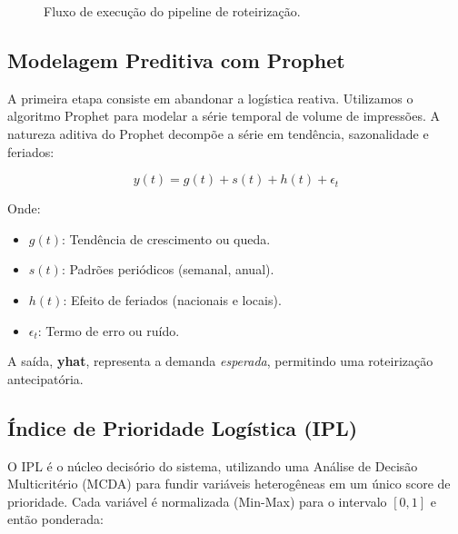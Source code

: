 \documentclass[11pt,a4paper,twocolumn]{article}
\begin{document}
\begin{figure}[H]
    \centering
    \caption{Fluxo de execução do pipeline de roteirização.}
    \label{fig:pipeline}
\end{figure}

\subsection{Modelagem Preditiva com Prophet}
A primeira etapa consiste em abandonar a logística reativa. Utilizamos o algoritmo Prophet \cite{explicacao_prophet} para modelar a série temporal de volume de impressões. A natureza aditiva do Prophet decompõe a série em tendência, sazonalidade e feriados:

$$ y(t) = g(t) + s(t) + h(t) + \epsilon_t $$

Onde:
\begin{itemize}
    \item $g(t)$: Tendência de crescimento ou queda.
    \item $s(t)$: Padrões periódicos (semanal, anual).
    \item $h(t)$: Efeito de feriados (nacionais e locais).
    \item $\epsilon_t$: Termo de erro ou ruído.
\end{itemize}

A saída, \textbf{yhat}, representa a demanda \textit{esperada}, permitindo uma roteirização antecipatória.

\subsection{Índice de Prioridade Logística (IPL)}
O IPL é o núcleo decisório do sistema, utilizando uma Análise de Decisão Multicritério (MCDA) para fundir variáveis heterogêneas em um único score de prioridade. Cada variável é normalizada (Min-Max) para o intervalo $[0, 1]$ e então ponderada:
\end{document}
